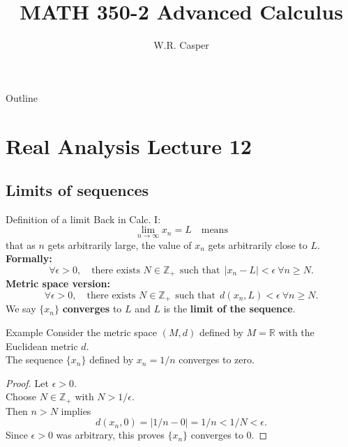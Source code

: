 \documentclass{beamer}
\title{MATH 350-2 Advanced Calculus}
\subtitle
{} %
\author[W.R. Casper] %
{W.R. Casper}
\institute[California State University Fullerton] %
{
  Department of Mathematics\\
  California State University Fullerton}
\begin{document}
\begin{frame}
  \titlepage
\end{frame}

\begin{frame}{Outline}
  \tableofcontents
\end{frame}



\section{Real Analysis Lecture 12}


\subsection{Limits of sequences}

\begin{frame}{Definition of a limit}
\pause
Back in Calc. I:
\pause
$$\lim_{n\rightarrow\infty} x_n = L\quad\text{means}$$
\pause
that as $n$ gets arbitrarily large, the value of $x_n$ gets arbitrarily close to $L$.\\
\pause
\textbf{Formally:}
\pause
$$\forall\epsilon > 0,\quad\text{there exists $N\in \mathbb{Z}_+$}\ \ \text{such that}\ \ |x_n-L| < \epsilon\ \forall n\geq N.$$
\pause
\textbf{Metric space version:}
\pause
$$\forall\epsilon > 0,\quad\text{there exists $N\in \mathbb{Z}_+$}\ \ \text{such that}\ \ d(x_n,L) < \epsilon\ \forall n\geq N.$$
\pause
We say $\{x_n\}$ \textbf{converges} to $L$ and $L$ is the \textbf{limit of the sequence}.
\end{frame}

\begin{frame}{Example}
\pause
Consider the metric space $(M,d)$ defined by $M=\mathbb{R}$ with the Euclidean metric $d$.\\
\pause
The sequence $\{x_n\}$ defined by $x_n = 1/n$ converges to zero.\\
\pause
\begin{proof}
\pause
Let $\epsilon > 0$.\\
\pause
Choose $N\in\mathbb{Z}_+$ with $N > 1/\epsilon$.\\
\pause
Then $n>N$ implies
\pause
$$d(x_n,0) = |1/n-0| = 1/n < 1/N < \epsilon.$$
\pause
Since $\epsilon > 0$ was arbitrary, this proves $\{x_n\}$ converges to $0$.
\pause
\end{proof}
\end{frame}
\end{document}
